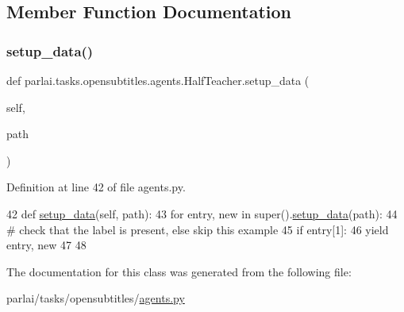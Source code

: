 \subsection{Member Function Documentation}
\mbox{\label{classparlai_1_1tasks_1_1opensubtitles_1_1agents_1_1HalfTeacher_a36081b74536cdad3bc3673b324da1f02}} 
\subsubsection{\texorpdfstring{setup\+\_\+data()}{setup\_data()}}
{\footnotesize\ttfamily def parlai.\+tasks.\+opensubtitles.\+agents.\+Half\+Teacher.\+setup\+\_\+data (\begin{DoxyParamCaption}\item[{}]{self,  }\item[{}]{path }\end{DoxyParamCaption})}



Definition at line 42 of file agents.\+py.


\begin{DoxyCode}
42     \textcolor{keyword}{def }\hyperlink{namespaceparlai_1_1tasks_1_1multinli_1_1agents_a4fa2cb0ba1ed745336ad8bceed36b841}{setup\_data}(self, path):
43         \textcolor{keywordflow}{for} entry, new \textcolor{keywordflow}{in} super().\hyperlink{namespaceparlai_1_1tasks_1_1multinli_1_1agents_a4fa2cb0ba1ed745336ad8bceed36b841}{setup\_data}(path):
44             \textcolor{comment}{# check that the label is present, else skip this example}
45             \textcolor{keywordflow}{if} entry[1]:
46                 \textcolor{keywordflow}{yield} entry, new
47 
48 
\end{DoxyCode}


The documentation for this class was generated from the following file\+:\begin{DoxyCompactItemize}
\item 
parlai/tasks/opensubtitles/\hyperlink{parlai_2tasks_2opensubtitles_2agents_8py}{agents.\+py}\end{DoxyCompactItemize}
